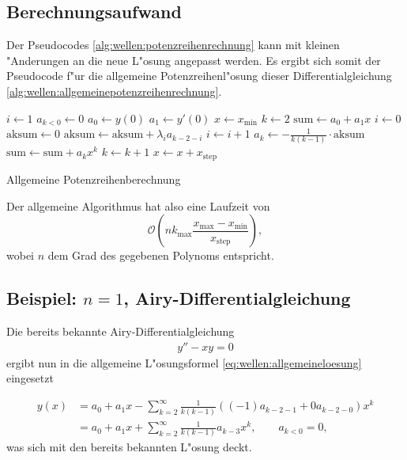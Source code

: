 \subsection{Berechnungsaufwand}
Der Pseudocodes \ref{alg:wellen:potenzreihenrechnung} kann mit kleinen 
"Anderungen an die neue L"osung angepasst werden. Es ergibt sich somit der 
Pseudocode f"ur die allgemeine Potenzreihenl"osung dieser Differentialgleichung 
\ref{alg:wellen:allgemeinepotenzreihenrechnung}.

\begin{algorithm}
	\begin{algorithmic}[1]
		\State $i \gets 1$
		\State $a_{k<0} \gets 0$
		\State $a_0 \gets y(0)$
		\State $a_1 \gets y'(0)$
		\State $x \gets x_{\text{min}}$
			\State $k \gets 2$
			\State $\text{sum} \gets a_0 + a_1x$
				\State $i \gets 0$
				\State $\text{aksum} \gets 0$
					\State $\text{aksum} \gets \text{aksum}+\lambda_i a_{k-2-i}$
					\State $i \gets i + 1$
				\EndFor
				\State $a_k \gets -\frac{1}{k(k-1)} \cdot \text{aksum}$
				\State $\text{sum} \gets \text{sum} + a_k x^k$
				\State $k \gets k + 1$
			\EndFor
			\State $x \gets x + x_{\text{step}}$
		\EndFor
	\end{algorithmic}
	\caption{Allgemeine Potenzreihenberechnung} 
	\label{alg:wellen:allgemeinepotenzreihenrechnung}
\end{algorithm}

Der allgemeine Algorithmus hat also eine Laufzeit von
\begin{equation*}
\mathcal{O}\left(nk_{\text{max}}\frac{x_{\text{max}}-x_{\text{min}}} 
{x_{\text{step}}}\right),
\end{equation*}
wobei $n$ dem Grad des gegebenen Polynoms entspricht.

\subsection{Beispiel: \texorpdfstring{$n = 1$}{n = 1}, 
Airy-Differentialgleichung}
Die bereits bekannte Airy-Differentialgleichung
\begin{align*}
	y''-xy = 0
\end{align*}
ergibt nun in die allgemeine L"osungsformel \ref{eq:wellen:allgemeineloesung} 
eingesetzt

\begin{equation*}
\begin{split}
	y(x) &= a_0+a_1x-\sum_{k=2}^{\infty} \frac{1}{k(k-1)} ((-1) a_{k-2-1} + 0 
	a_{k-2-0}) x^k
	\\
	&= a_0+a_1x+\sum_{k=2}^{\infty} \frac{1}{k(k-1)} a_{k-3} x^k,
	\qquad a_{k < 0} = 0,
\end{split}
\end{equation*}
was sich mit den bereits bekannten L"osung deckt.

